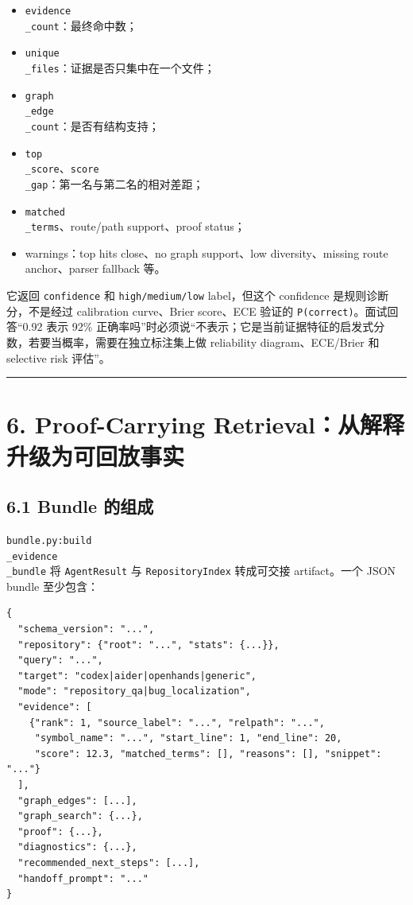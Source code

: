 \documentclass[UTF8,12pt,openany]{ctexbook}
\begin{document}
\begin{itemize}
\item \texttt{evidence\\_count}：最终命中数；
\item \texttt{unique\\_files}：证据是否只集中在一个文件；
\item \texttt{graph\\_edge\\_count}：是否有结构支持；
\item \texttt{top\\_score}、\texttt{score\\_gap}：第一名与第二名的相对差距；
\item \texttt{matched\\_terms}、route/path support、proof status；
\item warnings：top hits close、no graph support、low diversity、missing route anchor、parser fallback 等。
\end{itemize}

它返回 \texttt{confidence} 和 \texttt{high/medium/low} label，但这个 confidence 是规则诊断分，不是经过 calibration curve、Brier score、ECE 验证的 \texttt{P(correct)}。面试回答“0.92 表示 92\% 正确率吗”时必须说“不表示；它是当前证据特征的启发式分数，若要当概率，需要在独立标注集上做 reliability diagram、ECE/Brier 和 selective risk 评估”。\par

\hrule

\section{6. Proof-Carrying Retrieval：从解释升级为可回放事实}

\subsection{6.1 Bundle 的组成}

\texttt{bundle.py:build\\_evidence\\_bundle} 将 \texttt{AgentResult} 与 \texttt{RepositoryIndex} 转成可交接 artifact。一个 JSON bundle 至少包含：\par

\begin{lstlisting}
{
  "schema_version": "...",
  "repository": {"root": "...", "stats": {...}},
  "query": "...",
  "target": "codex|aider|openhands|generic",
  "mode": "repository_qa|bug_localization",
  "evidence": [
    {"rank": 1, "source_label": "...", "relpath": "...",
     "symbol_name": "...", "start_line": 1, "end_line": 20,
     "score": 12.3, "matched_terms": [], "reasons": [], "snippet": "..."}
  ],
  "graph_edges": [...],
  "graph_search": {...},
  "proof": {...},
  "diagnostics": {...},
  "recommended_next_steps": [...],
  "handoff_prompt": "..."
}
\end{lstlisting}
\end{document}
